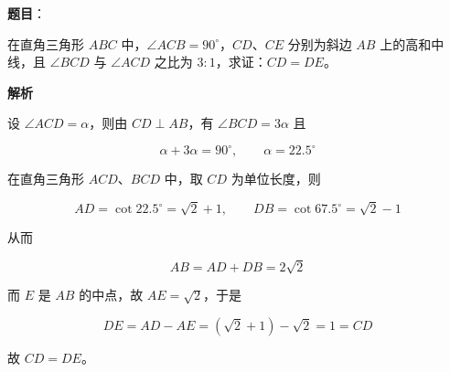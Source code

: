 \begin{answer}

\textbf{题目}：

在直角三角形 $ABC$ 中，$\angle ACB=90^\circ$，$CD\text{、}CE$ 分别为斜边 $AB$ 上的高和中线，且 $\angle BCD$ 与 $\angle ACD$ 之比为 $3:1$，求证：$CD=DE$。
\nopagebreak[4]
\begin{center}\end{center}
\nopagebreak[4]
\textbf{解析}

设 $\angle ACD=\alpha$，则由 $CD\perp AB$，有 $\angle BCD=3\alpha$ 且

\nopagebreak[4]
\[
\alpha+3\alpha=90^\circ,
\qquad \alpha=22.5^\circ
\]

在直角三角形 $ACD$、$BCD$ 中，取 $CD$ 为单位长度，则

\nopagebreak[4]
\[
AD=\cot22.5^\circ=\sqrt2+1,
\qquad
DB=\cot67.5^\circ=\sqrt2-1
\]

从而

\nopagebreak[4]
\[
AB=AD+DB=2\sqrt2
\]

而 $E$ 是 $AB$ 的中点，故 $AE=\sqrt2$，于是

\nopagebreak[4]
\[
DE=AD-AE=(\sqrt2+1)-\sqrt2=1=CD
\]

故 $CD=DE$。


\end{answer}
